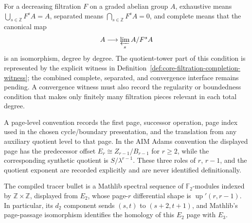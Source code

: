 \begin{definition}
  \label{def:complete-separated-filtration}
  \notready
  For a decreasing filtration $F$ on a graded abelian group $A$, exhaustive
  means $\bigcup_{s\in\mathbb Z}F^sA=A$, separated means
  $\bigcap_{s\in\mathbb Z}F^sA=0$, and complete means that the canonical map
  \[
    A\longrightarrow\varprojlim_s A/F^sA
  \]
  is an isomorphism, degree by degree.  The quotient-tower part of this
  condition is represented by the explicit witness in
  Definition~\ref{def:core-filtration-completion-witness}; the combined
  complete, separated, and convergence interface remains pending.  A
  convergence witness must also record the regularity or boundedness condition
  that makes only finitely many filtration pieces relevant in each total
  degree.
\end{definition}

\begin{definition}
  \label{def:ss-page-level}
  \notready
  A page-level convention records the first page, successor operation, page
  index used in the chosen cycle/boundary presentation, and the translation
  from any auxiliary quotient level to that page.  In the AIM Adams
  convention the displayed page has the predecessor offset
  $E_r\cong Z_{r-1}/B_{r-1}$ for $r\ge2$, while the corresponding synthetic
  quotient is $S/\lambda^{r-1}$.  These three roles of $r$, $r-1$, and the
  quotient exponent are recorded explicitly and are never identified
  definitionally.
\end{definition}

\begin{definition}
  \label{def:classical-adams-e2-e3-shape-slice}
  \leanok
  The compiled tracer bullet is a Mathlib spectral sequence of
  $\mathbb F_2$-modules indexed by $\mathbb Z\times\mathbb Z$, displayed from
  $E_2$, whose page-$r$ differential shape is
  $\operatorname{up}'(r,r-1)$.  In particular, its $d_2$ component sends
  $(s,t)$ to $(s+2,t+1)$, and Mathlib's page-passage isomorphism identifies
  the homology of this $E_2$ page with $E_3$.
\end{definition}

